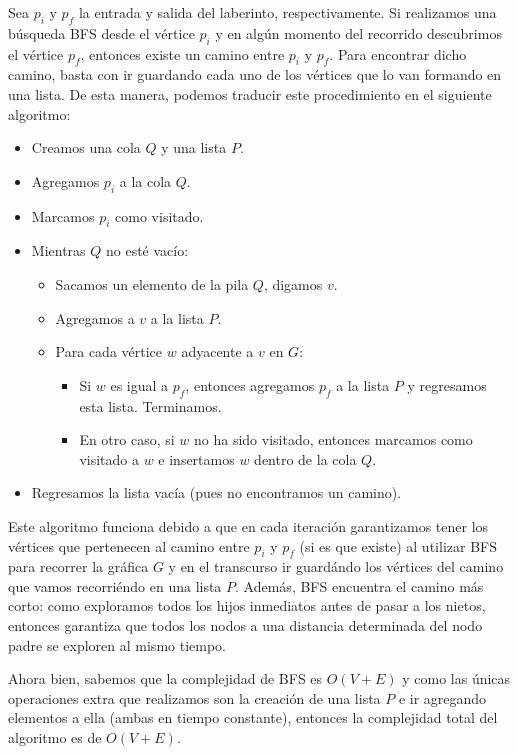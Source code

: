\documentclass[letterpaper,11pt]{article}
\begin{document}
\begin{enumerate}
    Sea $p_i$ y $p_f$ la entrada y salida del laberinto, respectivamente. 
    Si realizamos una búsqueda BFS desde el vértice $p_i$ y en algún momento 
    del recorrido descubrimos el vértice $p_f$, entonces existe un camino entre 
    $p_i$ y $p_f$. Para encontrar dicho camino, basta con ir guardando cada uno 
    de los vértices que lo van formando en una lista. De esta manera, podemos 
    traducir este procedimiento en el 
    siguiente algoritmo:
    \begin{itemize}
        \item Creamos una cola $Q$ y una lista $P$.
        \item Agregamos $p_i$ a la cola $Q$.
        \item Marcamos $p_i$ como visitado.
        \item Mientras $Q$ no esté vacío:
        \begin{itemize}
            \item Sacamos un elemento de la pila $Q$, digamos $v$.
            \item Agregamos a $v$ a la lista $P$.
            \item Para cada vértice $w$ adyacente a $v$ en $G$:
            \begin{itemize}
                \item Si $w$ es igual a $p_f$, entonces agregamos $p_f$ a la 
                lista $P$ y regresamos esta lista. Terminamos.
                \item En otro caso, si $w$ no ha sido visitado, entonces 
                marcamos como visitado a $w$ e insertamos $w$ dentro de la 
                cola $Q$.
            \end{itemize}
        \end{itemize}

        \item Regresamos la lista vacía (pues no encontramos un camino).
    \end{itemize}

    Este algoritmo funciona debido a que en cada iteración garantizamos tener
    los vértices que pertenecen al camino entre $p_i$ y $p_f$ (si es que 
    existe) al utilizar BFS para recorrer la gráfica $G$ y en el transcurso ir 
    guardándo los vértices del camino que vamos recorriéndo en una lista $P$. 
    Además, BFS encuentra el camino más corto: como exploramos todos los hijos
    inmediatos antes de pasar a los nietos, entonces garantiza que todos los 
    nodos a una distancia determinada del nodo padre se exploren al mismo tiempo.

    Ahora bien, sabemos que la complejidad de BFS es $O(V+E)$ y como las únicas 
    operaciones extra que realizamos son la creación de una lista $P$ e ir 
    agregando elementos a ella (ambas en tiempo constante), entonces la 
    complejidad total del algoritmo es de $O(V + E)$.
\end{enumerate}
\end{document}
